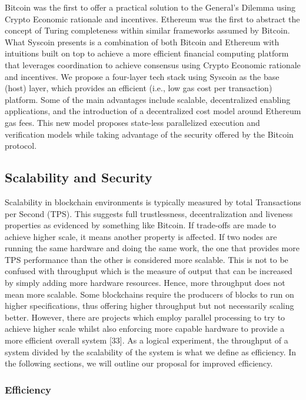 \documentclass[peerreview]{ieeesyscoin}
\begin{document}
Bitcoin was the first to offer a practical solution to the General's Dilemma using Crypto Economic rationale and incentives. Ethereum was the first to abstract the concept of Turing completeness within similar frameworks assumed by Bitcoin. What Syscoin presents is a combination of both Bitcoin and Ethereum with intuitions built on top to achieve a more efficient financial computing platform that leverages coordination to achieve consensus using Crypto Economic rationale and incentives. We propose a four-layer tech stack using Syscoin as the base (host) layer, which provides an efficient (i.e., low gas cost per transaction) platform. Some of the main advantages include scalable, decentralized enabling applications, and the introduction of a decentralized cost model around Ethereum gas fees. This new model proposes state-less parallelized execution and verification models while taking advantage of the security offered by the Bitcoin protocol. 

\subsection{Scalability and Security}

Scalability in blockchain environments is typically measured by total Transactions per Second (TPS). This suggests full trustlessness, decentralization and liveness properties as evidenced by something like Bitcoin. If trade-offs are made to achieve higher scale, it means another property is affected. If two nodes are running the same hardware and doing the same work, the one that provides more TPS performance than the other is considered more scalable. This is not to be confused with throughput which is the measure of output that can be increased by simply adding more hardware resources. Hence, more throughput does not mean more scalable. Some blockchains require the producers of blocks to run on higher specifications, thus offering higher throughput but not necessarily scaling better. However, there are projects which employ parallel processing to try to achieve higher scale whilst also enforcing more capable hardware to provide a more efficient overall system [33]. As a logical experiment, the throughput of a system divided by the scalability of the system is what we define as efficiency. In the following sections, we will outline our proposal for improved efficiency.

\subsubsection{Efficiency}
\end{document}
